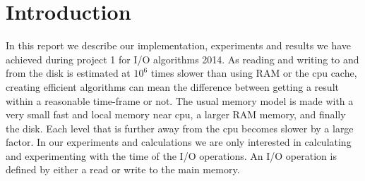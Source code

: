 \section{Introduction}

In this report we describe our implementation, experiments and results we have achieved during project 1 for I/O algorithms 2014.
As reading and writing to and from the disk is estimated at ${10^{6}}$ times slower than using RAM or the cpu cache, creating efficient algorithms can mean the difference between getting a result within a reasonable time-frame or not. 
The usual memory model is made with a very small fast and local memory near cpu, a larger RAM memory, and finally the disk. Each level that is further away from the cpu becomes slower by a large factor. In our experiments and calculations we are only interested in calculating and experimenting with the time of the I/O operations. An I/O operation is defined by either a read or write to the main memory.


